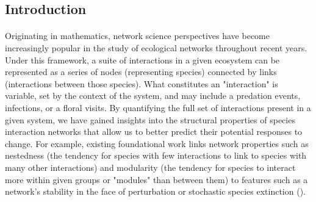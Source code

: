 \documentclass[12pt]{article}
\begin{document}
\clearpage

\subsection*{Introduction}


\paragraph*{}
Originating in mathematics, network science perspectives have become increasingly popular in the study of ecological networks throughout recent years. Under this framework, a suite of interactions in a given ecosystem can be represented as a series of nodes (representing species) connected by links (interactions between those species). What constitutes an "interaction" is variable, set by the context of the system, and may include a predation events, infections, or a floral visits. By quantifying the full set of interactions present in a given system, we have gained insights into the structural properties of species interaction networks that allow us to better predict their potential responses to change. For example, existing foundational work links network properties such as nestedness (the tendency for species with few interactions to link to species with many other interactions) and modularity (the tendency for species to interact more within given groups or "modules" than between them) to features such as a network's stability in the face of perturbation or stochastic species extinction (\cite{okuyama2008network, thebault2010stability, suweis2013emergence}).
\end{document}
